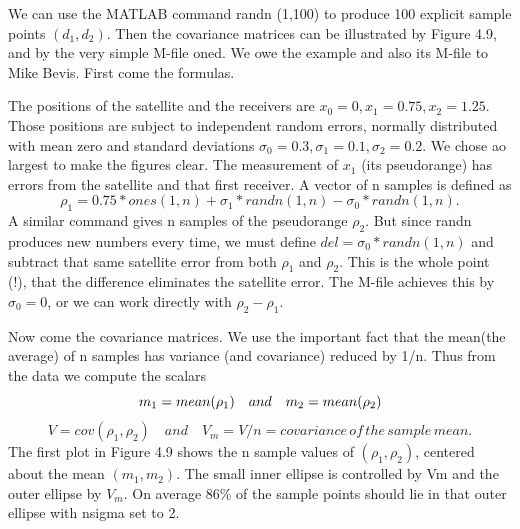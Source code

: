 We can use the MATLAB command randn (1,100) to produce 100 explicit sample points $(d_1,d_2)$. Then the covariance matrices can be illustrated by Figure 4.9, and by the
very simple M-file oned. We owe the example and also its M-file to Mike Bevis. First
come the formulas.

The positions of the satellite and the receivers are $x_0=0,x_1=0.75,x_2=1.25$.
Those positions are subject to independent random errors, normally distributed with mean
zero and standard deviations $\sigma_0=0.3,\sigma_1=0.1,\sigma_2=0.2$. We chose ao largest to make the figures clear. The measurement of $x_1$ (its pseudorange) has errors from the satellite and that first receiver. A vector of n samples is defined as 
\begin{equation*}
\rho_1=0.75\ast ones(1,n)+\sigma_1\ast randn(1,n)-\sigma_0\ast randn(1,n).
\end{equation*}
A similar command gives n samples of the pseudorange $\rho_2$. But since randn produces
new numbers every time, we must define $del = \sigma_0\ast randn(1,n)$ and subtract that same satellite error from both $\rho_1$ and $\rho_2$. This is the whole point (!), that the difference eliminates the satellite error. The M-file achieves this by $\sigma_0=0$, or we can work directly with $\rho_2-\rho_1$.

Now come the covariance matrices. We use the important fact that the mean(the
average) of n samples has variance (and covariance) reduced by 1/n. Thus from the data
we compute the scalars
\begin{equation*}
m_1=mean(\rho_1) \quad and \quad m_2=mean(\rho_2)\\
\end{equation*}
\begin{equation*}
V=cov(\rho_1,\rho_2)  \quad and \quad V_m=V/n=covariance\, of\, the\, sample\, mean. 
\end{equation*}
The first plot in Figure 4.9 shows the n sample values of $(\rho_1,\rho_2)$, centered about the mean $(m_1, m_2)$. The small inner ellipse is controlled by Vm and the outer ellipse by $V_m$. On average 86\% of the sample points should lie in that outer ellipse with nsigma set to 2.

